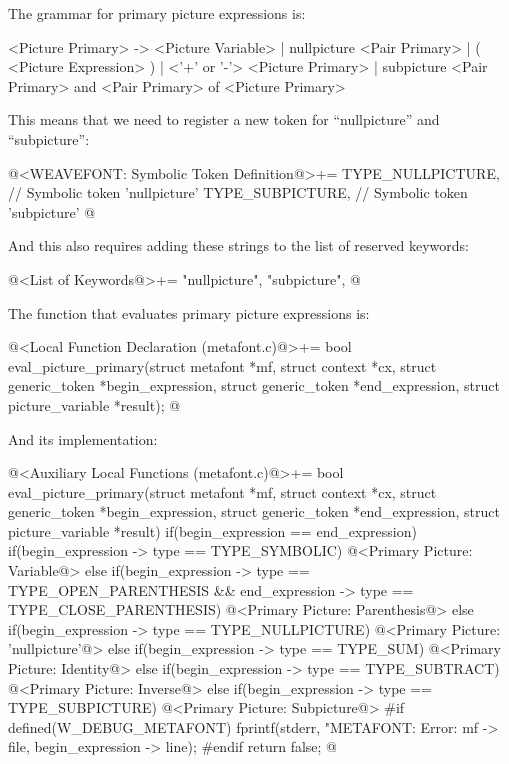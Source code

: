 {{{{{

The grammar for primary picture expressions is:

\alinhaverbatim
<Picture Primary> -> <Picture Variable> |
                     nullpicture <Pair Primary> |
                     ( <Picture Expression> ) |
                     <'+' or '-'> <Picture Primary> |
                     subpicture <Pair Primary> and <Pair Primary> of
                                <Picture Primary>
\alinhanormal

This means that we need to register a new token for ``nullpicture'' and
``subpicture'':

\iniciocodigo
@<WEAVEFONT: Symbolic Token Definition@>+=
TYPE_NULLPICTURE,        // Symbolic token 'nullpicture'
TYPE_SUBPICTURE,         // Symbolic token 'subpicture'
@
\fimcodigo

And this also requires adding these strings to the list of reserved
keywords:

\iniciocodigo
@<List of Keywords@>+=
"nullpicture", "subpicture",
@
\fimcodigo

The function that evaluates primary picture expressions is:

\iniciocodigo
@<Local Function Declaration (metafont.c)@>+=
bool eval_picture_primary(struct metafont *mf, struct context *cx,
                          struct generic_token *begin_expression,
                          struct generic_token *end_expression,
                          struct picture_variable *result);
@
\fimcodigo

And its implementation:

\iniciocodigo
@<Auxiliary Local Functions (metafont.c)@>+=
bool eval_picture_primary(struct metafont *mf, struct context *cx,
                         struct generic_token *begin_expression,
                         struct generic_token *end_expression,
                         struct picture_variable *result){
  if(begin_expression == end_expression){
    if(begin_expression -> type == TYPE_SYMBOLIC){
      @<Primary Picture: Variable@>
    }
  }
  else{
    if(begin_expression -> type == TYPE_OPEN_PARENTHESIS &&
      end_expression -> type == TYPE_CLOSE_PARENTHESIS){
      @<Primary Picture: Parenthesis@>
    }
    else if(begin_expression -> type == TYPE_NULLPICTURE){
      @<Primary Picture: 'nullpicture'@>
    }
    else if(begin_expression -> type == TYPE_SUM){
      @<Primary Picture: Identity@>
    }
    else if(begin_expression -> type == TYPE_SUBTRACT){
      @<Primary Picture: Inverse@>
    }
    else if(begin_expression -> type == TYPE_SUBPICTURE){
      @<Primary Picture: Subpicture@>
    }
  }
#if defined(W_DEBUG_METAFONT)
  fprintf(stderr, "METAFONT: Error: %
          mf -> file, begin_expression -> line);
#endif
  return false;
}
@
\fimcodigo

}}}}}
